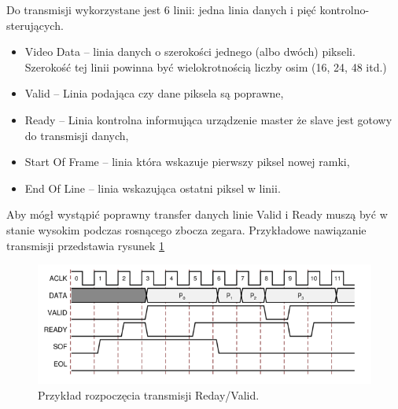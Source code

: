 Do transmisji wykorzystane jest 6 linii: jedna linia danych i pięć kontrolno-sterujących. 
\begin{itemize}
\item Video Data – linia danych o szerokości jednego (albo dwóch) pikseli. Szerokość tej linii powinna być wielokrotnością liczby osim (16, 24, 48 itd.)
\item Valid – Linia podająca czy dane piksela są poprawne,
\item Ready – Linia kontrolna informująca urządzenie master że slave jest gotowy do transmisji danych,
\item Start Of Frame – linia która wskazuje pierwszy piksel nowej ramki,
\item End Of Line – linia wskazująca ostatni piksel w linii.
\end{itemize}
Aby mógł wystąpić poprawny transfer danych linie Valid i Ready muszą być w stanie wysokim podczas rosnącego zbocza zegara. Przykładowe nawiązanie transmisji przedstawia rysunek \ref{fig:handshake}

\begin{figure}[h]
    \centering
    \includegraphics[width=1\textwidth]{images/axi-stream_hendshake}
    \caption{Przykład rozpoczęcia transmisji Reday/Valid.}
    \label{fig:handshake}
\end{figure}